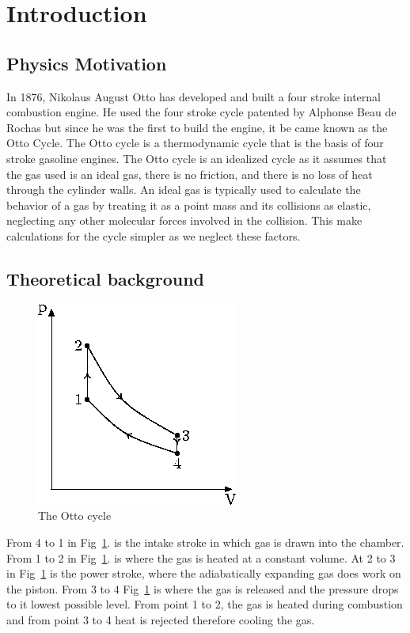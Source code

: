 \documentclass[11pt,letterpaper,onecolumn]{article}
\begin{document}
\section{Introduction}

\subsection{Physics Motivation}

  In 1876, Nikolaus August Otto has developed and built a four stroke internal combustion engine. He used the four stroke cycle patented by Alphonse Beau de Rochas but since he was the first to build the engine, it be came known as the Otto Cycle. The Otto cycle is a thermodynamic cycle that is the basis of four stroke gasoline engines. The Otto cycle is an idealized cycle as it assumes that the gas used is an ideal gas, there is no friction, and there is no loss of heat through the cylinder walls. An ideal gas is typically used to calculate the behavior of a gas by treating it as a point mass and its collisions as elastic, neglecting any other molecular forces involved in the collision. This make calculations for the cycle simpler as we neglect these factors.~\cite{Brit,Nave}

\subsection{Theoretical background}

\begin{figure}[H]
\centering
\includegraphics*[scale = 1]{Otto.png}
\caption{The Otto cycle}
\label{fig:sample}
\end{figure}

From 4 to 1 in Fig~\ref{fig:sample}. is the intake stroke in which gas is drawn into the chamber. From 1 to 2 in Fig~\ref{fig:sample}. is where the gas is heated at a constant volume. At 2 to 3 in Fig~\ref{fig:sample} is the power stroke, where the adiabatically expanding gas does work on the piston. From 3 to 4 Fig~\ref{fig:sample} is where the gas is released and the pressure drops to it lowest possible level. From point 1 to 2, the gas is heated during combustion and from point 3 to 4 heat is rejected therefore cooling the gas.
\end{document}
